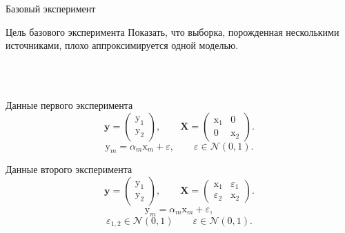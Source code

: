 \documentclass[9pt,pdf,hyperref={unicode}]{beamer}
\begin{document}
\begin{frame}{Базовый эксперимент}
\begin{block}{Цель базового эксперимента}
Показать, что выборка, порожденная несколькими источниками, плохо аппроксимируется одной моделью.
\end{block}\\
~\\
\begin{minipage}[t]{0.49\textwidth} 
   \begin{center}
   Данные первого эксперимента
   \[\mathbf{y} = \begin{pmatrix}
    \mathrm{y}_1\\
    \mathrm{y}_2
    \end{pmatrix}, \qquad\mathbf{X} = \begin{pmatrix}
    \mathrm{x}_1 & 0\\
    0 & \mathrm{x}_2
    \end{pmatrix}.\]
    \[\mathrm{y}_m = \alpha_{m}\mathrm{x}_m+ \varepsilon, \qquad \varepsilon \in \mathcal{N}(0, 1).\]
    \end{center}
    \end{minipage}%
    \begin{minipage}[t]{0.49\textwidth} 
    \begin{center}
    Данные второго эксперимента
   \[\mathbf{y} = \begin{pmatrix}
    \mathrm{y}_1\\
    \mathrm{y}_2
    \end{pmatrix}, \qquad\mathbf{X} = \begin{pmatrix}
    \mathrm{x}_1 & \varepsilon_1\\
    \varepsilon_2 & \mathrm{x}_2
    \end{pmatrix}.\]
    \[\mathrm{y}_m = \alpha_{m}\mathrm{x}_m+ \varepsilon,\] 
    \[\varepsilon_{1,2} \in \mathcal{N}(0,1) \qquad \varepsilon \in \mathcal{N}(0, 1).\]
   \end{center}
    
    
    \end{minipage}  
\end{frame}
\end{document}
